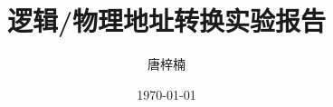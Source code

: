 \documentclass[12pt]{ctexart}
\begin{document}


\newpage

\tableofcontents
\newpage

\title{逻辑/物理地址转换实验报告}
\author{唐梓楠}
\date{\today}

\printbibliography
\end{document}
